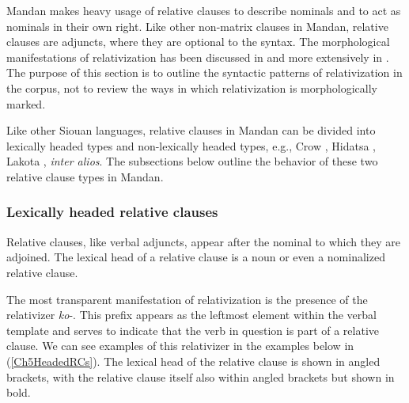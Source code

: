 Mandan makes heavy usage of relative clauses to describe nominals and to act as nominals in their own right. Like other non-matrix clauses in Mandan, relative clauses are adjuncts, where they are optional to the syntax. The morphological manifestations of relativization has been discussed in  and more extensively in . The purpose of this section is to outline the syntactic patterns of relativization in the corpus, not to review the ways in which relativization is morphologically marked.

Like other Siouan languages, relative clauses in Mandan can be divided into lexically headed types and non-lexically headed types, e.g., Crow \citep[252]{graczyk1997}, Hidatsa \citep[296]{boyle2007}, Lakota \citep[79]{ingham2003}, \textit{inter alios}. The subsections below outline the behavior of these two relative clause types in Mandan.

\subsubsection{Lexically headed relative clauses}\label{Ch5SubSecHeadedRCs}

Relative clauses, like verbal adjuncts, appear after the nominal to which they are adjoined. The lexical head of a relative clause is a noun or even a nominalized relative clause.

The most transparent manifestation of relativization is the presence of the relativizer \textit{ko}-. This prefix appears as the leftmost element within the verbal template and serves to indicate that the verb in question is part of a relative clause. We can see examples of this relativizer in the examples below in (\ref{Ch5HeadedRCs}). The lexical head of the relative clause is shown in angled brackets, with the relative clause itself also within angled brackets but shown in bold.

